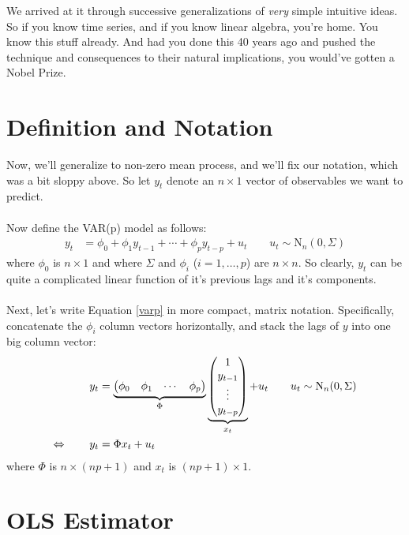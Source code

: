 \documentclass[a4paper,12pt]{scrartcl}
\begin{document}
We arrived at it through successive generalizations
of \emph{very} simple intuitive ideas. So if you know
time series, and if you know linear algebra, you're home.
You know this stuff already. And had you done this 40 years
ago and pushed the technique and consequences
to their natural implications, you would've gotten a Nobel 
Prize. 


\newpage
\section{Definition and Notation}

Now, we'll generalize to non-zero mean process, and 
we'll fix our notation, which was a bit
sloppy above.  So let $y_t$ denote
an $n\times 1$ vector of observables we
want to predict.  
\\
\\
Now define the VAR(p) model as follows:
\begin{align}
    \label{varp}
    y_t &= \phi_0 + \phi_1 y_{t-1} + \cdots + 
	\phi_p y_{t-p} + u_{t} 
	\qquad u_t \sim \text{N}_n(0, \Sigma)
\end{align}
where $\phi_0$ is $n\times 1$ and where $\Sigma$ and
$\phi_i$ ($i = 1, \ldots, p$) are $n\times n$.
So clearly, $y_t$ can be quite a complicated linear
function of it's previous lags and it's components.
\\
\\
Next, let's write Equation \ref{varp} in more
compact, matrix notation.  Specifically, concatenate
the $\phi_i$ column vectors horizontally, and stack the lags 
of $y$ into one big column vector:
\begin{align} 
    y_t &= \underbrace{\begin{pmatrix} \phi_0 & \phi_1 & \cdots 
	& \phi_p \end{pmatrix}}_{\Phi}
	\underbrace{\begin{pmatrix} 
	    1 \\ y_{t-1} \\ \vdots \\ y_{t-p}
	\end{pmatrix}}_{x_t} + u_t \qquad u_t \sim \text{N}_n(0, \Sigma) 
	 \notag \\
    \Leftrightarrow \qquad y_t &= \Phi x_t + u_t 
    \label{varvec}
\end{align} 
where $\Phi$ is $n\times (np +1)$ and $x_t$ is 
$(np+1) \times 1$.


\section{OLS Estimator}
\end{document}

